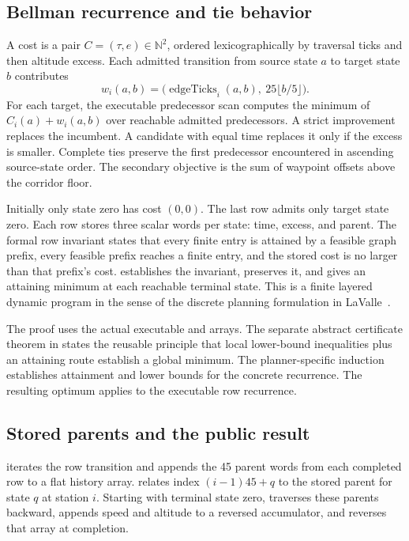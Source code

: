 \documentclass[11pt]{article}
\newcommand{\N}{\mathbb N}
\begin{document}
\subsection{Bellman recurrence and tie behavior}

A cost is a pair $C=(\tau,e)\in\N^2$, ordered lexicographically by traversal ticks and then altitude excess.  Each admitted transition from source state $a$ to target state $b$ contributes
\[
 w_i(a,b)=\bigl(\operatorname{edgeTicks}_i(a,b),\ 25\lfloor b/5\rfloor\bigr).
\]
For each target, the executable predecessor scan computes the minimum of $C_i(a)+w_i(a,b)$ over reachable admitted predecessors.  A strict improvement replaces the incumbent.  A candidate with equal time replaces it only if the excess is smaller.  Complete ties preserve the first predecessor encountered in ascending source-state order.  The secondary objective is the sum of waypoint offsets above the corridor floor.

Initially only state zero has cost $(0,0)$.  The last row admits only target state zero.  Each row stores three scalar words per state: time, excess, and parent.  The formal row invariant states that every finite entry is attained by a feasible graph prefix, every feasible prefix reaches a finite entry, and the stored cost is no larger than that prefix's cost.   establishes the invariant,  preserves it, and  gives an attaining minimum at each reachable terminal state.  This is a finite layered dynamic program in the sense of the discrete planning formulation in LaValle~\cite{lavalle}.

The proof uses the actual executable  and  arrays.  The separate abstract certificate theorem in  states the reusable principle that local lower-bound inequalities plus an attaining route establish a global minimum.  The planner-specific induction establishes attainment and lower bounds for the concrete recurrence.  The resulting optimum applies to the executable row recurrence.

\subsection{Stored parents and the public result}

 iterates the row transition and appends the 45 parent words from each completed row to a flat history array.   relates index $(i-1)45+q$ to the stored parent for state $q$ at station $i$.  Starting with terminal state zero,  traverses these parents backward, appends speed and altitude to a reversed accumulator, and reverses that array at completion.
\end{document}
